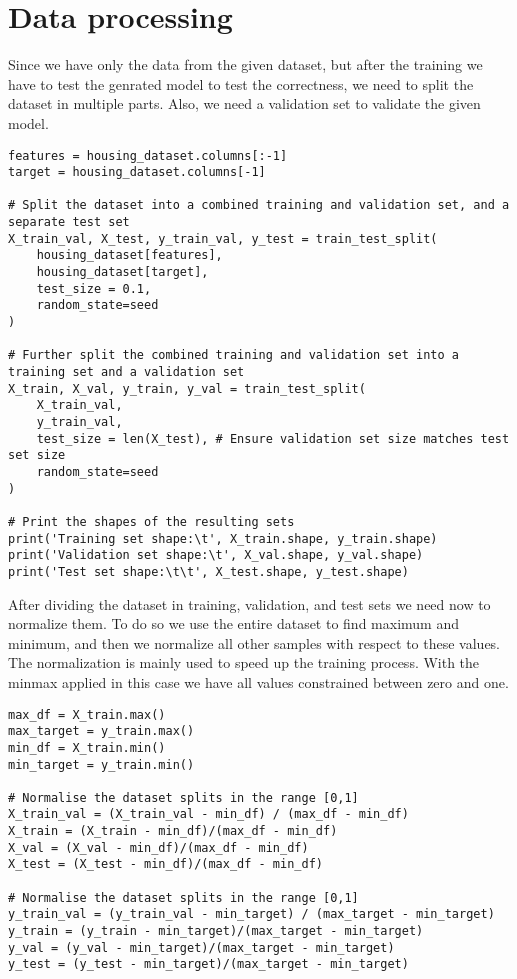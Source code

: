 \section{Data processing}

Since we have only the data from the given dataset, but after the training we have to test the genrated model to test the correctness, we need to split the dataset in multiple parts. 
Also, we need a validation set to validate the given model. 
\begin{lstlisting}[style=Python]
features = housing_dataset.columns[:-1]
target = housing_dataset.columns[-1]

# Split the dataset into a combined training and validation set, and a separate test set
X_train_val, X_test, y_train_val, y_test = train_test_split(
    housing_dataset[features],
    housing_dataset[target],
    test_size = 0.1,
    random_state=seed
)

# Further split the combined training and validation set into a training set and a validation set
X_train, X_val, y_train, y_val = train_test_split(
    X_train_val,
    y_train_val,
    test_size = len(X_test), # Ensure validation set size matches test set size
    random_state=seed
)

# Print the shapes of the resulting sets
print('Training set shape:\t', X_train.shape, y_train.shape)
print('Validation set shape:\t', X_val.shape, y_val.shape)
print('Test set shape:\t\t', X_test.shape, y_test.shape)
\end{lstlisting}
After dividing the dataset in training, validation, and test sets we need now to normalize them.
To do so we use the entire dataset to find maximum and minimum, and then we normalize all other samples with respect to these values. 
The normalization is mainly used to speed up the training process. 
With the minmax applied in this case we have all values constrained between zero and one. 
\begin{lstlisting}[style=Python]
max_df = X_train.max()
max_target = y_train.max()
min_df = X_train.min()
min_target = y_train.min()

# Normalise the dataset splits in the range [0,1]
X_train_val = (X_train_val - min_df) / (max_df - min_df)
X_train = (X_train - min_df)/(max_df - min_df)
X_val = (X_val - min_df)/(max_df - min_df)
X_test = (X_test - min_df)/(max_df - min_df)

# Normalise the dataset splits in the range [0,1]
y_train_val = (y_train_val - min_target) / (max_target - min_target)
y_train = (y_train - min_target)/(max_target - min_target)
y_val = (y_val - min_target)/(max_target - min_target)
y_test = (y_test - min_target)/(max_target - min_target)
\end{lstlisting}